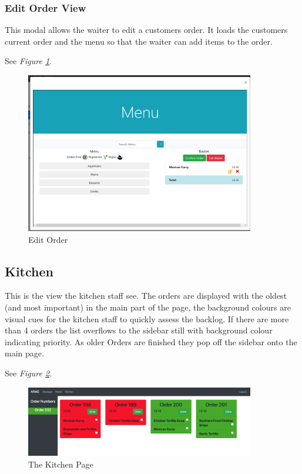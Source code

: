\documentclass[12pt, twoside, a4paper]{report}
\begin{document}
\subsubsection*{Edit Order View}
This modal allows the waiter to edit a customers order. It loads the customers current order and the menu so that the waiter can add items to the order.

See \textit{Figure \ref{fig:editOrder}}.

\begin{figure}[H]
  \centering
  \includegraphics[width=10cm]{editOrder.png}
  \caption{Edit Order}
  \label{fig:editOrder}
\end{figure}

\subsection*{Kitchen}
This is the view the kitchen staff see.
The orders are displayed with the oldest (and most important) in the main part of the page, the background colours are visual cues for the kitchen staff to quickly assess the backlog.
If there are more than 4 orders the list overflows to the sidebar still with background colour indicating priority.
As older Orders are finished they pop off the sidebar onto the main page.

See \textit{Figure \ref{fig:kitchen1}}.

\begin{figure}[H]
  \centering
  \includegraphics[width=10cm]{Kitchen1.png}
  \caption{The Kitchen Page}
  \label{fig:kitchen1}
\end{figure}
\end{document}
